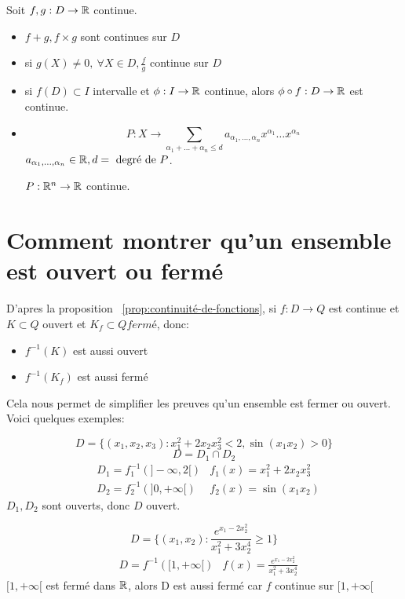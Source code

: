 \begin{prop}
   Soit $f, g: D \to \mathbb{R}$ continue. 
   \begin{itemize}
       \item $f + g, f \times g$ sont continues sur $D$
       \item si  $g(X) \neq 0, \: \forall X \in D, \frac{f}{g}$ continue sur $D$
       \item si  $f(D) \subset I$ intervalle et $\phi: I \to \mathbb{R}$ continue, alors $\phi \circ f: D \to \mathbb{R}$ est continue.
       \item 
           \[
               P: X \to \sum_{\alpha_1 + \ldots + \alpha_n \le d}^{} a_{\alpha_1, \ldots, \alpha_n}x^{\alpha_1} \ldots x^{\alpha_n}
           \] 
           $a_{\alpha_1, \ldots, \alpha_n} \in \mathbb{R}, d = \text{ degré de } P$. 
           \par
           $P: \mathbb{R}^n \to \mathbb{R}$ continue.
   \end{itemize}
\end{prop}
\section{Comment montrer qu'un ensemble est ouvert ou fermé}
D'apres la proposition ~\ref{prop:continuité-de-fonctions}, si $f: D \to Q$ est continue et $K \subset Q$ ouvert et $K_f \subset Q fermé$, donc:
\begin{itemize}
    \item $f^{-1}(K)$ est aussi ouvert
    \item $f^{-1}(K_f)$ est aussi fermé
\end{itemize}
Cela nous permet de simplifier les preuves qu'un ensemble est fermer ou ouvert. Voici quelques exemples:
\begin{eg}
   \[
       D = \{(x_1, x_2, x_3): x_1^2 + 2x_2x_3^2 < 2, \sin(x_1x_2) > 0\}
   \]  
   \[
   D = D_1 \cap D_2
   \] 
   \begin{align*}
       &D_1 = f_1^{-1}(]-\infty, 2[) &f_1(x) = x_1^2 + 2x_2x_3^2\\
       &D_2 = f_2^{-1}(]0, +\infty[) &f_2(x) = \sin(x_1x_2)
   \end{align*}
   $D_1, D_2$ sont ouverts, donc $D$ ouvert.
\end{eg}
\begin{eg}
   \[
       D = \{(x_1, x_2): \frac{e^{x_1 - 2x_2^2}}{x_1^2 + 3x_2^4} \ge 1 \}
   \]  
   \begin{align*}
       &D = f^{-1}([1, +\infty[) &f(x) = \frac{e^{x_1 - 2x_2^2}}{x_1^2 + 3x_2^4}
   \end{align*}
   $[1, +\infty[$ est fermé dans $\mathbb{R}$, alors D est aussi fermé car $f$ continue sur  $[1, +\infty[$
\end{eg}

